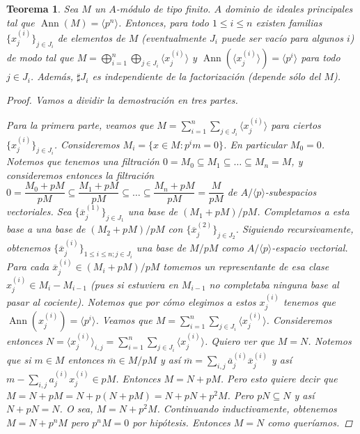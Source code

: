 \documentclass[12pt]{book}
\newtheorem{teo}{Teorema}[section]
\theoremstyle{definition}
\DeclareMathOperator{\ann}{Ann}
\begin{document}
\begin{teo}
Sea $M$ un $A$-módulo de tipo finito. $A$ dominio de ideales principales tal que $\ann(M)=\langle p^n\rangle$. Entonces, para todo $1\leq i\leq n$ existen familias $\{x_j^{(i)}\}_{j\in J_i}$ de elementos de $M$ (eventualmente $J_i$ puede ser vacío para algunos $i$) de modo tal que $M=\displaystyle\bigoplus_{i=1}^n \displaystyle\bigoplus_{j\in J_i} \langle x_j^{(i)}\rangle$ y $\ann(\langle x_j^{(i)}\rangle) = \langle p^i\rangle$ para todo $j\in J_{i}$. Además, $\sharp J_i$ es independiente de la factorización (depende sólo del $M$).
\begin{proof}
Vamos a dividir la demostración en tres partes.

Para la primera parte, veamos que $M=\displaystyle\sum_{i=1}^n \sum_{j\in J_i} \langle x_j^{(i)}\rangle$ para ciertos $\{x_j^{(i)}\}_{j\in J_i}$. Consideremos $M_i=\{x\in M : p^i m = 0\}$. En particular $M_0=0$. Notemos que tenemos una filtración $0=M_0\subseteq M_1\subseteq\ldots\subseteq M_n=M$, y consideremos entonces la filtración $0=\dfrac{M_0+pM}{pM}\subseteq \dfrac{M_1+pM}{pM}\subseteq \ldots \subseteq \dfrac{M_n + pM}{pM}=\dfrac{M}{pM}$ de $A/\langle p\rangle$-subespacios vectoriales. Sea $\{\overline{x}_j^{(1)}\}_{j\in J_1}$ una base de $(M_1+pM)/pM$. Completamos a esta base a una base de $(M_2 + pM)/pM$ con $\{\overline{x}_j^{(2)}\}_{j\in J_2}$. Siguiendo recursivamente, obtenemos $\{\overline{x}_j^{(i)}\}_{1\leq i\leq n; j\in J_i}$ una base de $M/pM$ como $A/\langle p\rangle$-espacio vectorial. Para cada $\overline{x}_j^{(i)}\in (M_i + pM)/pM$ tomemos un representante de esa clase $x_j^{(i)}\in M_i- M_{i-1}$ (pues si estuviera en $M_{i-1}$ no completaba ninguna base al pasar al cociente). Notemos que por cómo elegimos a estos $x_j^{(i)}$ tenemos que $\ann(x_j^{(i)}) = \langle p^i\rangle$. Veamos que $M=\displaystyle\sum_{i=1}^n \sum_{j\in J_i} \langle x_j^{(i)}\rangle$. Consideremos entonces $N=\langle x_j^{(i)}\rangle_{i,j} = \displaystyle\sum_{i=1}^n \sum_{j\in J_i} \langle x_j^{(i)}\rangle$. Quiero ver que $M=N$. Notemos que si $m\in M$ entonces $\overline{m}\in M/pM$ y así $\overline{m} = \displaystyle\sum_{i,j} \overline{a}_{j}^{(i)} \overline{x}_j^{(i)}$ y así $m - \displaystyle\sum_{i,j}a_j^{(i)}x_j^{(i)}\in pM$. Entonces $M=N+pM$. Pero esto quiere decir que $M = N+pM = N + p(N+pM) = N+pN + p^2M$. Pero $pN\subseteq N$ y así $N+pN=N$. O sea, $M = N + p^2M$. Continuando inductivamente, obtenemos $M = N + p^n M$ pero $p^nM=0$ por hipótesis. Entonces $M=N$ como queríamos.


\end{proof}
\end{teo}
\end{document}
